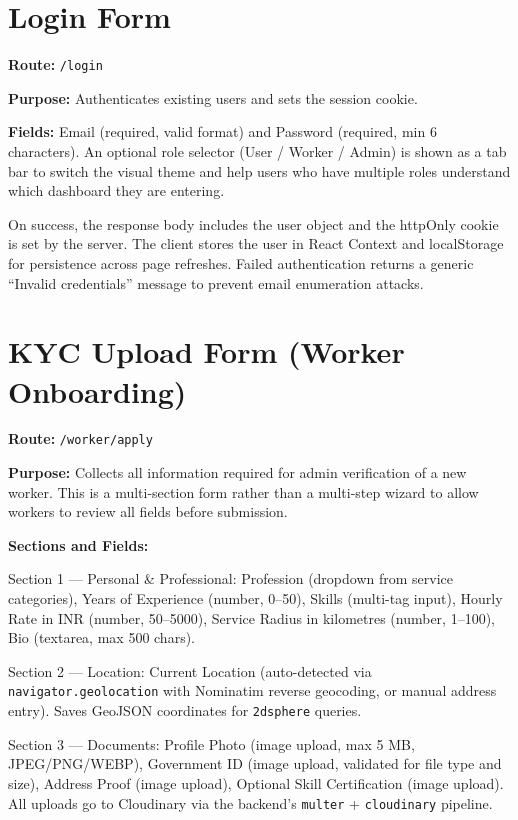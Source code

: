 \documentclass[12pt,a4paper]{report}
\begin{document}
\section{Login Form}

\textbf{Route:} \texttt{/login}

\textbf{Purpose:} Authenticates existing users and sets the session cookie.

\textbf{Fields:} Email (required, valid format) and Password (required, min 6 characters). An optional role selector (User / Worker / Admin) is shown as a tab bar to switch the visual theme and help users who have multiple roles understand which dashboard they are entering.

On success, the response body includes the user object and the httpOnly cookie is set by the server. The client stores the user in React Context and localStorage for persistence across page refreshes. Failed authentication returns a generic ``Invalid credentials'' message to prevent email enumeration attacks.

\section{KYC Upload Form (Worker Onboarding)}

\textbf{Route:} \texttt{/worker/apply}

\textbf{Purpose:} Collects all information required for admin verification of a new worker. This is a multi-section form rather than a multi-step wizard to allow workers to review all fields before submission.

\textbf{Sections and Fields:}

Section 1 — Personal \& Professional: Profession (dropdown from service categories), Years of Experience (number, 0--50), Skills (multi-tag input), Hourly Rate in INR (number, 50--5000), Service Radius in kilometres (number, 1--100), Bio (textarea, max 500 chars).

Section 2 — Location: Current Location (auto-detected via \texttt{navigator.geolocation} with Nominatim reverse geocoding, or manual address entry). Saves GeoJSON coordinates for \texttt{2dsphere} queries.

Section 3 — Documents: Profile Photo (image upload, max 5 MB, JPEG/PNG/WEBP), Government ID (image upload, validated for file type and size), Address Proof (image upload), Optional Skill Certification (image upload). All uploads go to Cloudinary via the backend's \texttt{multer} + \texttt{cloudinary} pipeline.
\end{document}
